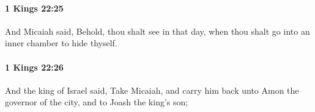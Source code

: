 		\paragraph{1 Kings 22:25} %
			\label{1KINGS-22-25}

			And Micaiah said, Behold, thou shalt see in that day, when thou shalt go into an inner chamber to hide thyself.


		\paragraph{1 Kings 22:26} %
			\label{1KINGS-22-26}

			And the king of Israel said, Take Micaiah, and carry him back unto Amon the governor of the city, and to Joash the king’s son;


